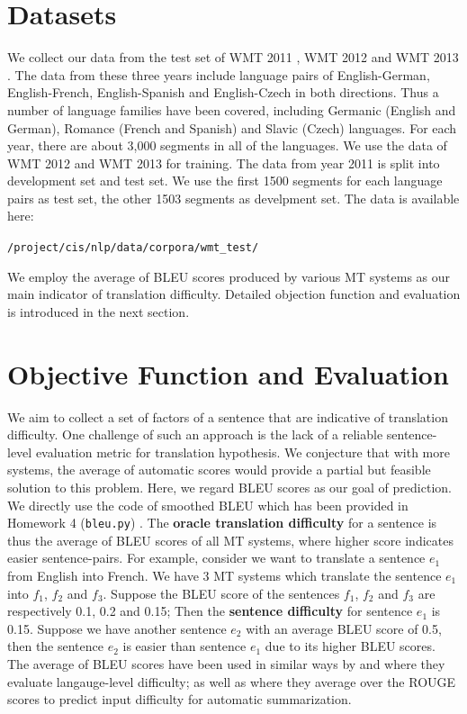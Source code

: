 \documentclass[11pt]{article}
\begin{document}
\section{Datasets}
We collect our data from the test set of WMT 2011 \cite{callisonburch-EtAl:2011:WMT}, WMT 2012 \cite{callisonburch-EtAl:2012:WMT} and WMT 2013 \cite{bojar-EtAl:2013:WMT}.
The data from these three years include language pairs of English-German, English-French, English-Spanish and English-Czech in both directions. 
Thus a number of language families have been covered, including Germanic (English and German), Romance (French and Spanish) and Slavic (Czech) languages.
For each year, there are about 3,000 segments in all of the languages. 
We use the data of WMT 2012 and WMT 2013 for training. 
The data from year 2011 is split into development set and test set.
We use the first 1500 segments for each language pairs as test set, the other 1503 segments as develpment set. 
The data is available here:\\
\begin{footnotesize}{\tt /project/cis/nlp/data/corpora/wmt\_test/}\end{footnotesize}
We employ the average of BLEU scores produced by various MT systems as our main indicator of translation difficulty. Detailed objection function and evaluation is introduced in the next section.

\section{Objective Function and Evaluation}
We aim to collect a set of factors of a sentence that are indicative of translation difficulty. 
One challenge of such an approach is the lack of a reliable sentence-level evaluation metric for translation hypothesis. 
We conjecture that with more systems, the average of automatic scores would provide a partial but feasible solution to this problem.
Here, we regard BLEU scores as our goal of prediction. 
We directly use the code of smoothed BLEU which has been provided in Homework 4  (\texttt{bleu.py}) \cite{Liang:2006:EDA:1220175.1220271}.
The {\bf oracle translation difficulty} for a sentence is thus the average of BLEU scores of all MT systems, where higher score indicates easier sentence-pairs.
For example, consider we want to translate a sentence $e_1$ from English into French. 
We have 3 MT systems which translate the sentence $e_1$ into $f_1$, $f_2$ and $f_3$. 
Suppose the BLEU score of the sentences $f_1$, $f_2$ and $f_3$  are respectively 0.1, 0.2 and 0.15; 
Then the {\bf sentence difficulty} for sentence $e_1$ is 0.15.
Suppose we have another sentence $e_2$ with an average BLEU score of 0.5, then the sentence $e_2$ is easier than sentence $e_1$ due to its higher BLEU scores.
The average of BLEU scores have been used in similar ways by  and  where they evaluate langauge-level difficulty; 
as well as  where they average over the ROUGE scores to predict input difficulty for automatic summarization.
\end{document}
